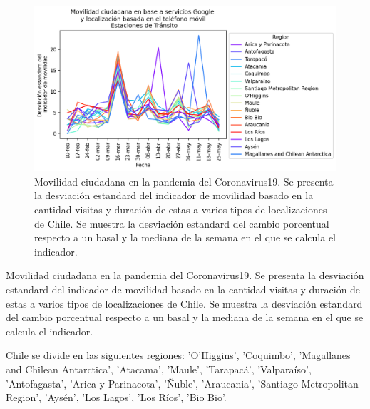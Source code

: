 \documentclass{article}
\begin{document}
\begin{figure}[H]
	\centering
	\begin{adjustbox}{width=0.8\textwidth}
		\includegraphics{./chile_DS.png} %
	\end{adjustbox}
	\caption{Movilidad ciudadana en la pandemia del Coronavirus19. Se presenta la desviación estandard del indicador de movilidad basado en la cantidad visitas y duración de estas a varios tipos de localizaciones de Chile. Se muestra la desviación estandard del cambio porcentual respecto a un basal y la mediana de la semana en el que se calcula el indicador. }
	\label{fig:movilidad chile_DS}
\end{figure}


\begin{table}[H]
	\begin{adjustbox}{width=1\textwidth}
	\end{adjustbox}
	\caption{Movilidad ciudadana en la pandemia del Coronavirus19. Se presenta la desviación estandard del indicador de movilidad basado en la cantidad visitas y duración de estas a varios tipos de localizaciones de Chile. Se muestra la desviación estandard del cambio porcentual respecto a un basal y la mediana de la semana en el que se calcula el indicador. }
	\label{tab:movilidad chile_DS}
\end{table}


 Chile se divide en las siguientes regiones: 'O'Higgins', 'Coquimbo', 'Magallanes and Chilean Antarctica', 'Atacama',
'Maule', 'Tarapacá', 'Valparaíso', 'Antofagasta', 'Arica y Parinacota',
'Ñuble', 'Araucania', 'Santiago Metropolitan Region', 'Aysén',
'Los Lagos', 'Los Ríos', 'Bio Bio'.


\newpage


\end{document}
